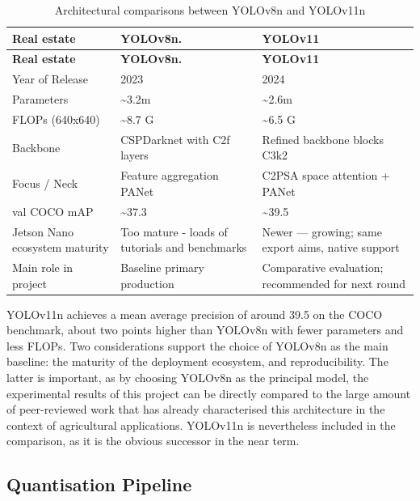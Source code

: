 \documentclass[12pt,a4paper]{report}
\renewcommand{\arraystretch}{1.25}
\begin{document}
\begingroup
\small
\setlength{\parskip}{0pt}
\setlength{\tabcolsep}{4pt}
\renewcommand{\arraystretch}{1.2}
\begin{longtable}{|P{0.24\textwidth}|P{0.30\textwidth}|P{0.34\textwidth}|}
\caption{Architectural comparisons between YOLOv8n and YOLOv11n}\\
\hline
\textbf{Real estate} & \textbf{YOLOv8n.} & \textbf{YOLOv11} \\ \hline
\endfirsthead
\hline
\textbf{Real estate} & \textbf{YOLOv8n.} & \textbf{YOLOv11} \\ \hline
\endhead
Year of Release & 2023 & 2024 \\ \hline
Parameters & \textasciitilde{}3.2m & \textasciitilde{}2.6m \\ \hline
FLOPs (640x640) & \textasciitilde{}8.7 G & \textasciitilde{}6.5 G \\ \hline
Backbone & CSPDarknet with C2f layers & Refined backbone blocks C3k2 \\ \hline
Focus / Neck & Feature aggregation PANet & C2PSA space attention + PANet \\ \hline
val COCO mAP & \textasciitilde{}37.3 & \textasciitilde{}39.5 \\ \hline
Jetson Nano ecosystem maturity & Too mature - loads of tutorials and benchmarks & Newer --- growing; same export aims, native support \\ \hline
Main role in project & Baseline primary production & Comparative evaluation; recommended for next round \\ \hline
\end{longtable}
\endgroup

YOLOv11n achieves a mean average precision of around 39.5 on the COCO benchmark, about two points higher than YOLOv8n with fewer parameters and less FLOPs. Two considerations support the choice of YOLOv8n as the main baseline: the maturity of the deployment ecosystem, and reproducibility. The latter is important, as by choosing YOLOv8n as the principal model, the experimental results of this project can be directly compared to the large amount of peer-reviewed work that has already characterised this architecture in the context of agricultural applications. YOLOv11n is nevertheless included in the comparison, as it is the obvious successor in the near term.

\subsection{Quantisation Pipeline}
\end{document}
